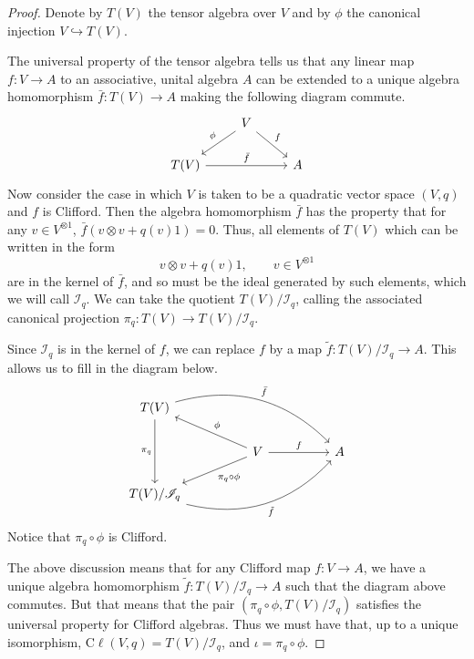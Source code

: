 \documentclass[a4paper,10pt]{scrreprt}
\newcommand{\cliff}{\mathrm{C}\ell}
\theoremstyle{definition}
\theoremstyle{plain}
\theoremstyle{remark}
\begin{document}
\begin{proof}
  Denote by $T(V)$ the tensor algebra over $V$ and by $\phi$ the canonical injection $V 
  \hookrightarrow T(V)$.

  The universal property of the tensor algebra tells us that any linear map $f\colon V \to A$ to an associative, unital algebra $A$ can be extended to a unique algebra homomorphism $\bar{f}\colon T(V) \to A$ making the following diagram commute.
  \begin{equation*}
    \begin{tikzcd}
      & V \arrow[dr, "f"] \arrow[dl, swap, "\phi"] & \\
      T(V) \arrow[rr, "\bar{f}"] & & A
    \end{tikzcd}
  \end{equation*}
  Now consider the case in which $V$ is taken to be a quadratic vector space $(V,q)$ and $f$ is Clifford. Then the algebra homomorphism $\bar{f}$ has the property that for any $v \in V^{\otimes 1}$, $\bar{f}(v \otimes v + q(v) 1) = 0$. Thus, all elements of $T(V)$ which can be written in the form
  \begin{equation*}
    v \otimes v + q(v)1,\qquad v \in V^{\otimes 1}
  \end{equation*}
  are in the kernel of $\bar{f}$, and so must be the ideal generated by such elements, which we will call $\mathscr{I}_{q}$. We can take the quotient $T(V)/\mathscr{I}_{q}$, calling the associated canonical projection $\pi_{q}\colon T(V) \to T(V)/\mathscr{I}_{q}$.

  Since $\mathscr{I}_{q}$ is in the kernel of $f$, we can replace $f$ by a map $\tilde{f}\colon T(V)/\mathscr{I}_{q} \to A$. This allows us to fill in the diagram below.
  \begin{equation*}
    \begin{tikzcd}[column sep=huge]
      T(V) \arrow[dd, swap, "\pi_{q}"] \arrow[drr, bend left, "\bar{f}"] & & \\
      & V \arrow[ul, swap, "\phi"] \arrow[dl, "\pi_{q} \circ \phi"] \arrow[r, "f"] & A \\
      {T(V)/\mathscr{I}_{q}} \arrow[urr, bend right, swap, "\tilde{f}"]
    \end{tikzcd}
  \end{equation*}
  Notice that $\pi_{q} \circ \phi$ is Clifford. 

  The above discussion means that for any Clifford map $f\colon V \to A$, we have a unique algebra homomorphism $\tilde{f}\colon T(V)/\mathscr{I}_{q} \to A$ such that the diagram above commutes. But that means that the pair $(\pi_{q} \circ \phi, T(V)/\mathscr{I}_{q})$ satisfies the universal property for Clifford algebras. Thus we must have that, up to a unique isomorphism, $\cliff(V,q) = T(V)/\mathscr{I}_{q}$, and $\iota = \pi_{q} \circ \phi$.
\end{proof}
\end{document}
